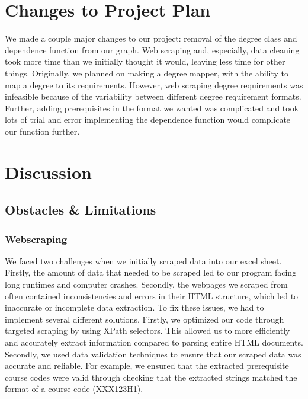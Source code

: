 \documentclass[fontsize=11pt]{article}
\begin{document}
\section*{Changes to Project Plan}
We made a couple major changes to our project: removal of the degree class and dependence function from our graph. Web scraping and, especially, data cleaning took more time than we initially thought it would, leaving less time for other things. Originally, we planned on making a degree mapper, with the ability to map a degree to its requirements. However, web scraping degree requirements was infeasible because of the variability between different degree requirement formats. Further, adding prerequisites in the format we wanted was complicated and took lots of trial and error implementing the dependence function would complicate our function further.

\section*{Discussion}
\subsection{Obstacles & Limitations}
\subsubsection{Webscraping}
We faced two challenges when we initially scraped data into our excel sheet. Firstly, the amount of data that needed to be scraped led to our program facing long runtimes and computer crashes. Secondly, the webpages we scraped from often contained inconsistencies and errors in their HTML structure, which led to inaccurate or incomplete data extraction. To fix these issues, we had to implement several different solutions. Firstly, we optimized our code through targeted scraping by using XPath selectors. This allowed us to more efficiently and accurately extract information compared to parsing entire HTML documents. Secondly, we used data validation techniques to ensure that our scraped data was accurate and reliable. For example, we ensured that the extracted prerequisite course codes were valid through checking that the extracted strings matched the format of a course code (XXX123H1).
\end{document}

